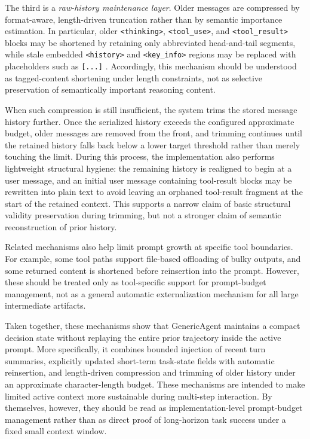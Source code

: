 The third is a \emph{raw-history maintenance layer}. Older messages are compressed by format-aware, length-driven truncation rather than by semantic importance estimation. In particular, older \texttt{<thinking>}, \texttt{<tool\_use>}, and \texttt{<tool\_result>} blocks may be shortened by retaining only abbreviated head-and-tail segments, while stale embedded \texttt{<history>} and \texttt{<key\_info>} regions may be replaced with placeholders such as \texttt{[...]} . Accordingly, this mechanism should be understood as tagged-content shortening under length constraints, not as selective preservation of semantically important reasoning content.

When such compression is still insufficient, the system trims the stored message history further. Once the serialized history exceeds the configured approximate budget, older messages are removed from the front, and trimming continues until the retained history falls back below a lower target threshold rather than merely touching the limit. During this process, the implementation also performs lightweight structural hygiene: the remaining history is realigned to begin at a user message, and an initial user message containing tool-result blocks may be rewritten into plain text to avoid leaving an orphaned tool-result fragment at the start of the retained context. This supports a narrow claim of basic structural validity preservation during trimming, but not a stronger claim of semantic reconstruction of prior history.

Related mechanisms also help limit prompt growth at specific tool boundaries. For example, some tool paths support file-based offloading of bulky outputs, and some returned content is shortened before reinsertion into the prompt. However, these should be treated only as tool-specific support for prompt-budget management, not as a general automatic externalization mechanism for all large intermediate artifacts.

Taken together, these mechanisms show that GenericAgent maintains a compact decision state without replaying the entire prior trajectory inside the active prompt. More specifically, it combines bounded injection of recent turn summaries, explicitly updated short-term task-state fields with automatic reinsertion, and length-driven compression and trimming of older history under an approximate character-length budget. These mechanisms are intended to make limited active context more sustainable during multi-step interaction. By themselves, however, they should be read as implementation-level prompt-budget management rather than as direct proof of long-horizon task success under a fixed small context window.

